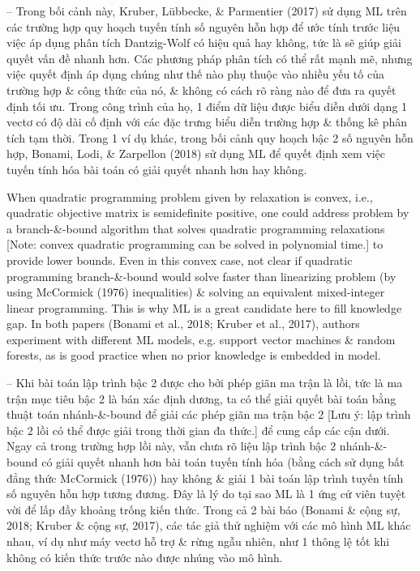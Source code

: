 \documentclass{article}
\begin{document}
\begin{itemize}
\begin{itemize}
\begin{itemize}
            -- Trong bối cảnh này, Kruber, Lübbecke, \& Parmentier (2017) sử dụng ML trên các trường hợp quy hoạch tuyến tính số nguyên hỗn hợp để ước tính trước liệu việc áp dụng phân tích Dantzig-Wolf có hiệu quả hay không, tức là sẽ giúp giải quyết vấn đề nhanh hơn. Các phương pháp phân tích có thể rất mạnh mẽ, nhưng việc quyết định áp dụng chúng như thế nào phụ thuộc vào nhiều yếu tố của trường hợp \& công thức của nó, \& không có cách rõ ràng nào để đưa ra quyết định tối ưu. Trong công trình của họ, 1 điểm dữ liệu được biểu diễn dưới dạng 1 vectơ có độ dài cố định với các đặc trưng biểu diễn trường hợp \& thống kê phân tích tạm thời. Trong 1 ví dụ khác, trong bối cảnh quy hoạch bậc 2 số nguyên hỗn hợp, Bonami, Lodi, \& Zarpellon (2018) sử dụng ML để quyết định xem việc tuyến tính hóa bài toán có giải quyết nhanh hơn hay không.

            When quadratic programming problem given by relaxation is convex, i.e., quadratic objective matrix is semidefinite positive, one could address problem by a branch-\&-bound algorithm that solves quadratic programming relaxations [Note: convex quadratic programming can be solved in polynomial time.] to provide lower bounds. Even in this convex case, not clear if quadratic programming branch-\&-bound would solve faster than linearizing problem (by using McCormick (1976) inequalities) \& solving an equivalent mixed-integer linear programming. This is why ML is a great candidate here to fill knowledge gap. In both papers (Bonami et al., 2018; Kruber et al., 2017), authors experiment with different ML models, e.g. support vector machines \& random forests, as is good practice when no prior knowledge is embedded in model.

            -- Khi bài toán lập trình bậc 2 được cho bởi phép giãn ma trận là lồi, tức là ma trận mục tiêu bậc 2 là bán xác định dương, ta có thể giải quyết bài toán bằng thuật toán nhánh-\&-bound để giải các phép giãn ma trận bậc 2 [Lưu ý: lập trình bậc 2 lồi có thể được giải trong thời gian đa thức.] để cung cấp các cận dưới. Ngay cả trong trường hợp lồi này, vẫn chưa rõ liệu lập trình bậc 2 nhánh-\&-bound có giải quyết nhanh hơn bài toán tuyến tính hóa (bằng cách sử dụng bất đẳng thức McCormick (1976)) hay không \& giải 1 bài toán lập trình tuyến tính số nguyên hỗn hợp tương đương. Đây là lý do tại sao ML là 1 ứng cử viên tuyệt vời để lấp đầy khoảng trống kiến thức. Trong cả 2 bài báo (Bonami \& cộng sự, 2018; Kruber \& cộng sự, 2017), các tác giả thử nghiệm với các mô hình ML khác nhau, ví dụ như máy vectơ hỗ trợ \& rừng ngẫu nhiên, như 1 thông lệ tốt khi không có kiến thức trước nào được nhúng vào mô hình.


\end{itemize}
\end{itemize}
\end{itemize}
\end{document}
